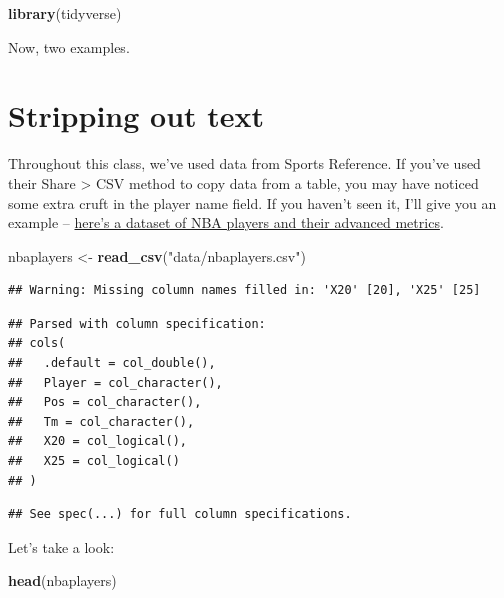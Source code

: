 \documentclass[
]{book}
\newenvironment{Shaded}{\begin{snugshade}}{\end{snugshade}}
\newcommand{\KeywordTok}[1]{\textcolor[rgb]{0.13,0.29,0.53}{\textbf{#1}}}
\newcommand{\NormalTok}[1]{#1}
\newcommand{\StringTok}[1]{\textcolor[rgb]{0.31,0.60,0.02}{#1}}
\begin{document}
\begin{Shaded}
\begin{Highlighting}[]
\KeywordTok{library}\NormalTok{(tidyverse)}
\end{Highlighting}
\end{Shaded}

Now, two examples.

\hypertarget{stripping-out-text}{%
\section{Stripping out text}\label{stripping-out-text}}

Throughout this class, we've used data from Sports Reference. If you've used their Share \textgreater{} CSV method to copy data from a table, you may have noticed some extra cruft in the player name field. If you haven't seen it, I'll give you an example -- \href{https://unl.box.com/s/bx89eg0ooccpovm3ii7jnbjj3xaby2qd}{here's a dataset of NBA players and their advanced metrics}.

\begin{Shaded}
\begin{Highlighting}[]
\NormalTok{nbaplayers <-}\StringTok{ }\KeywordTok{read_csv}\NormalTok{(}\StringTok{"data/nbaplayers.csv"}\NormalTok{)}
\end{Highlighting}
\end{Shaded}

\begin{verbatim}
## Warning: Missing column names filled in: 'X20' [20], 'X25' [25]
\end{verbatim}

\begin{verbatim}
## Parsed with column specification:
## cols(
##   .default = col_double(),
##   Player = col_character(),
##   Pos = col_character(),
##   Tm = col_character(),
##   X20 = col_logical(),
##   X25 = col_logical()
## )
\end{verbatim}

\begin{verbatim}
## See spec(...) for full column specifications.
\end{verbatim}

Let's take a look:

\begin{Shaded}
\begin{Highlighting}[]
\KeywordTok{head}\NormalTok{(nbaplayers)}
\end{Highlighting}
\end{Shaded}
\end{document}
